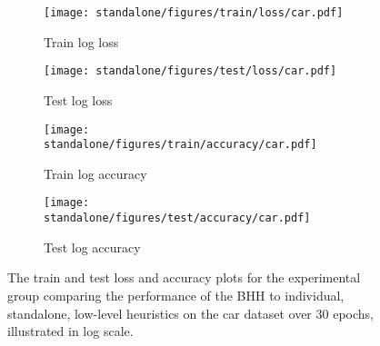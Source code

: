 \begin{figure}[htpb]
      \begin{subfigure}{0.5\textwidth}
            \centering
            \texttt{[image: standalone/figures/train/loss/car.pdf]}
            \caption{Train log loss}
            \label{fig:results:standalone:figures:loss:train:car}
      \end{subfigure}
      \begin{subfigure}{0.5\textwidth}
            \centering
            \texttt{[image: standalone/figures/test/loss/car.pdf]}
            \caption{Test log loss}
            \label{fig:results:standalone:figures:loss:test:car}
      \end{subfigure}
      \par\bigskip
      \par\bigskip
      \begin{subfigure}{0.5\textwidth}
            \centering
            \texttt{[image: standalone/figures/train/accuracy/car.pdf]}
            \caption{Train log accuracy}
            \label{fig:results:standalone:figures:accuracy:train:car}
      \end{subfigure}
      \begin{subfigure}{0.5\textwidth}
            \centering
            \texttt{[image: standalone/figures/test/accuracy/car.pdf]}
            \caption{Test log accuracy}
            \label{fig:results:standalone:figures:accuracy:test:car}
      \end{subfigure}
      \par\bigskip
      \caption{The train and test loss and accuracy plots for the experimental group comparing the performance of the \acs{BHH} to individual, standalone, low-level heuristics on the car dataset over 30 epochs, illustrated in log scale.}
      \label{fig:results:standalone:figures:car}
\end{figure}

